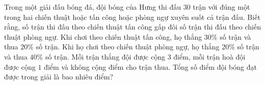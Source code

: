 \begin{ex}%
	Trong một giải đấu bóng đá, đội bóng của Hưng thi đấu $30$ trận với đúng một trong hai chiến thuật hoặc tấn công hoặc phòng ngự xuyên suốt cả trận đấu. Biết rằng, số trận thi đấu theo chiến thuật tấn công gấp đôi số trận thi đấu theo chiến thuật phòng ngự. Khi chơi theo chiến thuật tấn công, họ thắng $30\%$ số trận và thua $20\%$ số trận. Khi họ chơi theo chiến thuật phòng ngự, họ thắng $20\%$ số trận và thua $40\%$ số trận. Mỗi trận thắng đội được cộng $3$ điểm, mỗi trận hoà đội được cộng $1$ điểm và không cộng điểm cho trận thua. Tổng số điểm đội bóng đạt được trong giải là bao nhiêu điểm?
\end{ex}

